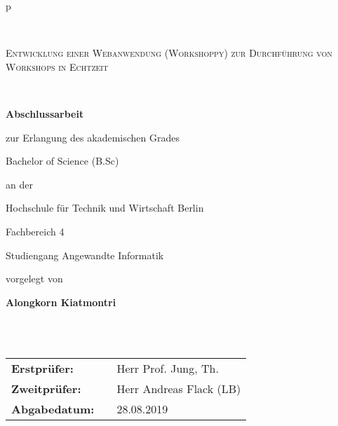 \begin{center}
\begin{tabular}{p{\textwidth}}




\\

\begin{center}
\LARGE{\textsc{
Entwicklung einer Webanwendung (Workshoppy) zur
Durchführung von Workshops in Echtzeit\\
}}
\end{center}
\\

\begin{center}
\textbf{\Large{Abschlussarbeit}}
\end{center}

\begin{center}
zur Erlangung des akademischen Grades\par
Bachelor of Science (B.Sc)
\end{center}

\begin{center}
an der\par
\end{center}

\begin{center}
\large{Hochschule für Technik und Wirtschaft Berlin\par
Fachbereich 4\par
Studiengang Angewandte Informatik \\}
\end{center}

\begin{center}
vorgelegt von
\end{center}

\begin{center}
\large{\textbf{Alongkorn Kiatmontri}} \\
\end{center}

\\

\\
\begin{center}
\begin{tabular}{lll}
\textbf{Erstprüfer:} & & Herr Prof. Jung, Th.\\
\textbf{Zweitprüfer:} & & Herr Andreas Flack (LB)\\
\textbf{Abgabedatum:} & & 28.08.2019
\end{tabular}
\end{center}

\end{tabular}
\end{center}